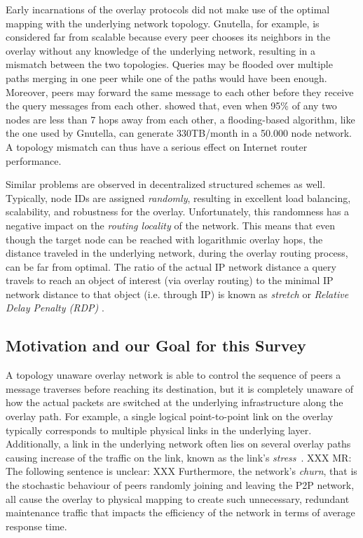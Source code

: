Early incarnations of the overlay protocols did not make use of the
optimal mapping with the underlying network topology. Gnutella, for
example, is considered far from scalable \cite{ritter_gnucantscale_2001} because
every peer chooses its neighbors in the overlay without any knowledge
of the underlying network, resulting in a mismatch between the two topologies.
Queries may be flooded over multiple paths merging in
one peer while one of the paths would have been enough.
Moreover, peers may forward the same message to each other before they
receive the query messages from each other. \cite{matei_mapgnutella_2002} showed
that, even when 95\% of any two nodes are less than 7 hops away from each
other, a flooding-based algorithm, like the one used by Gnutella, can generate
330TB/month in a 50.000 node network. A topology mismatch can thus have
a serious effect on Internet router performance.

Similar problems are observed in decentralized structured schemes as well.
Typically, node IDs are assigned \emph{randomly}, resulting in excellent load
balancing, scalability, and robustness for the overlay. Unfortunately, this randomness has a
negative impact on the \emph{routing locality} of the network. This means that
even though the target node can be reached with logarithmic overlay hops, the
distance traveled in the underlying network, during the overlay routing
process, can be far from optimal.  The ratio of the actual IP network distance a query
travels to reach an object of interest (via overlay routing) to
the minimal IP network distance to that
object (i.e. through IP) is known as \emph{stretch} or
\emph{Relative Delay Penalty (RDP)} \cite{chu_esm_2000}.

\subsection{Motivation and our Goal for this Survey}
A topology unaware overlay network is able to control the sequence of peers a
message traverses before reaching its destination, but it is completely unaware
of how the actual packets are switched at the underlying infrastructure along
the overlay path. For example, a single logical point-to-point link on the
overlay typically corresponds to multiple physical links in the
underlying layer. Additionally, a link in the underlying network often lies
on several overlay paths causing increase of the traffic on the
link, known as the link's \emph{stress}~\cite{chu_esm_2002}.
XXX MR:  The following sentence is unclear: XXX
Furthermore, the network's \emph{churn}, that is the stochastic behaviour of
peers randomly joining and leaving the P2P network, all cause the overlay to
physical mapping to create such unnecessary, redundant maintenance traffic that
impacts the efficiency of the network in terms of average response time.


